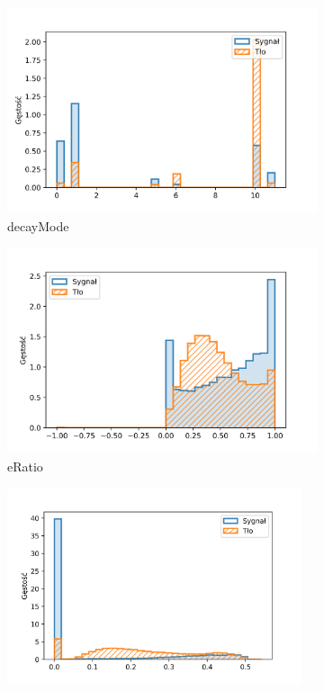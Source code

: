 \documentclass{pracalicmgr}
\begin{document}
	\begin{figure}
	\begin{subfigure}{.5\textwidth}
	\centering
	\includegraphics[width=1\textwidth]{difference_decayMode.png}
	\caption{decayMode}
	\end{subfigure}
	\begin{subfigure}{.5\textwidth}
	\centering
	\includegraphics[width=1\textwidth]{difference_eRatio.png}
	\caption{eRatio}
	\end{subfigure}
	\begin{subfigure}{.5\textwidth}
	\centering
	\includegraphics[width=0.95\textwidth]{difference_ptWeightedDrIsolation.png}

\end{subfigure}
\end{figure}
\end{document}
